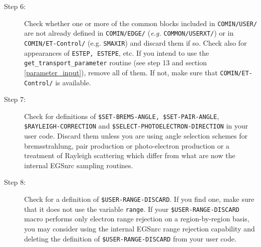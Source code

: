 \begin{description}

\item[Step 6:]
Check whether one or more of the common blocks  
included in {\tt COMIN/USER/} are 
not already defined in {\tt COMIN/EDGE/} ({\em e.g.} {\tt COMMON/USERXT/}) 
or in {\tt COMIN/ET-Control/} (e.g. {\tt SMAXIR}) and discard them if so.
Check also for appearances of {\tt ESTEP, ESTEPE}, etc. 
If you intend to use the {\tt get\_transport\_parameter} routine 
(see step 13 and section \ref{parameter_input}), remove all 
of them. If not, make sure that {\tt COMIN/ET-Control/} is 
available. 


\item[Step 7:]
Check for definitions of {\tt \$SET-BREMS-ANGLE, \$SET-PAIR-ANGLE}, 
\\{\tt \$RAYLEIGH-CORRECTION} and  {\tt \$SELECT-PHOTOELECTRON-DIRECTION} 
in your user code. 
Discard them unless you are using angle selection schemes 
for bremsstrahlung, pair production or photo-electron production or 
a treatment of Rayleigh scattering which differ from what are now the
internal EGSnrc sampling routines.

\item [Step 8:]
Check for a definition of {\tt \$USER-RANGE-DISCARD}. 
If you find one, make sure that it does not use 
the variable {\tt range}. If your {\tt \$USER-RANGE-DISCARD} 
macro performs only electron range rejection on a region-by-region 
basis, you may consider using the internal EGSnrc range rejection 
capability and deleting the definition of {\tt \$USER-RANGE-DISCARD} 
from your user code. 


\end{description}
